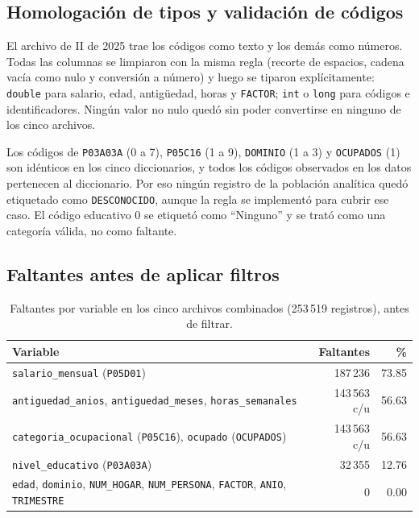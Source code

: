 \documentclass[11pt,a4paper]{article}
\newcommand{\var}[1]{\texttt{#1}}
\begin{document}
\subsection{Homologación de tipos y validación de códigos}

El archivo de II de 2025 trae los códigos como texto y los demás como números. Todas las columnas se limpiaron con la misma regla (recorte de espacios, cadena vacía como nulo y conversión a número) y luego se tiparon explícitamente: \var{double} para salario, edad, antigüedad, horas y \var{FACTOR}; \var{int} o \var{long} para códigos e identificadores. Ningún valor no nulo quedó sin poder convertirse en ninguno de los cinco archivos.

Los códigos de \var{P03A03A} (0 a 7), \var{P05C16} (1 a 9), \var{DOMINIO} (1 a 3) y \var{OCUPADOS} (1) son idénticos en los cinco diccionarios, y todos los códigos observados en los datos pertenecen al diccionario. Por eso ningún registro de la población analítica quedó etiquetado como \var{DESCONOCIDO}, aunque la regla se implementó para cubrir ese caso. El código educativo 0 se etiquetó como ``Ninguno'' y se trató como una categoría válida, no como faltante.

\subsection{Faltantes antes de aplicar filtros}

\begin{table}[H]
\centering
\caption{Faltantes por variable en los cinco archivos combinados (253\,519 registros), antes de filtrar.}
\label{tab:faltantes}
\small
\begin{tabular}{lrr}
\toprule
Variable & Faltantes & \% \\
\midrule
\var{salario\_mensual} (\var{P05D01}) & 187\,236 & 73.85 \\
\var{antiguedad\_anios}, \var{antiguedad\_meses}, \var{horas\_semanales} & 143\,563 c/u & 56.63 \\
\var{categoria\_ocupacional} (\var{P05C16}), \var{ocupado} (\var{OCUPADOS}) & 143\,563 c/u & 56.63 \\
\var{nivel\_educativo} (\var{P03A03A}) & 32\,355 & 12.76 \\
\var{edad}, \var{dominio}, \var{NUM\_HOGAR}, \var{NUM\_PERSONA}, \var{FACTOR}, \var{ANIO}, \var{TRIMESTRE} & 0 & 0.00 \\
\bottomrule
\end{tabular}
\end{table}
\end{document}
